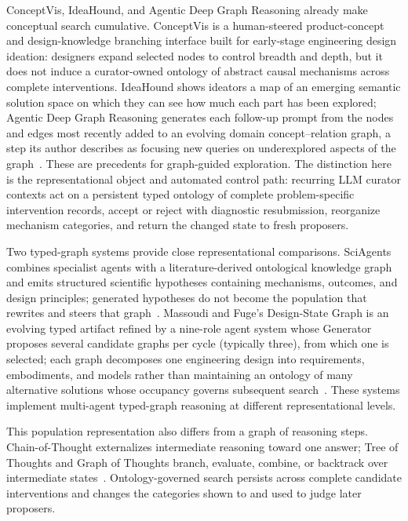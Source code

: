 \documentclass[11pt,a4paper]{article}
\begin{document}
ConceptVis, IdeaHound, and Agentic Deep Graph Reasoning already make conceptual search cumulative. ConceptVis is a human-steered product-concept and design-knowledge branching interface built for early-stage engineering design ideation: designers expand selected nodes to control breadth and depth, but it does not induce a curator-owned ontology of abstract causal mechanisms across complete interventions. IdeaHound shows ideators a map of an emerging semantic solution space on which they can see how much each part has been explored; Agentic Deep Graph Reasoning generates each follow-up prompt from the nodes and edges most recently added to an evolving domain concept--relation graph, a step its author describes as focusing new queries on underexplored aspects of the graph~\cite{duan2024conceptvis,duan2026conceptvis,siangliulue2016ideahound,buehler2025agentic}. These are precedents for graph-guided exploration. The distinction here is the representational object and automated control path: recurring LLM curator contexts act on a persistent typed ontology of complete problem-specific intervention records, accept or reject with diagnostic resubmission, reorganize mechanism categories, and return the changed state to fresh proposers.

Two typed-graph systems provide close representational comparisons. SciAgents combines specialist agents with a literature-derived ontological knowledge graph and emits structured scientific hypotheses containing mechanisms, outcomes, and design principles; generated hypotheses do not become the population that rewrites and steers that graph~\cite{ghafarollahi2024sciagents}. Massoudi and Fuge's Design-State Graph is an evolving typed artifact refined by a nine-role agent system whose Generator proposes several candidate graphs per cycle (typically three), from which one is selected; each graph decomposes one engineering design into requirements, embodiments, and models rather than maintaining an ontology of many alternative solutions whose occupancy governs subsequent search~\cite{massoudi2025design}. These systems implement multi-agent typed-graph reasoning at different representational levels.

This population representation also differs from a graph of reasoning steps. Chain-of-Thought externalizes intermediate reasoning toward one answer; Tree of Thoughts and Graph of Thoughts branch, evaluate, combine, or backtrack over intermediate states~\cite{wei2022cot,yao2023tot,besta2024got}. Ontology-governed search persists across complete candidate interventions and changes the categories shown to and used to judge later proposers.
\end{document}

